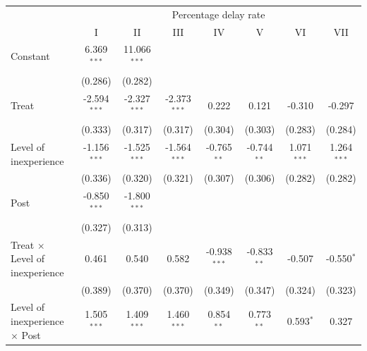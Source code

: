 \documentclass[
]{article}
\begin{document}
\begin{tabular}{lccccccc}
   \toprule
    & \multicolumn{7}{c}{Percentage delay rate}\\
                                                        & I              & II             & III            & IV             & V             & VI             & VII\\  
   Constant                                             & 6.369$^{***}$  & 11.066$^{***}$ &                &                &               &                &   \\   
                                                        & (0.286)        & (0.282)        &                &                &               &                &   \\   
   Treat                                                & -2.594$^{***}$ & -2.327$^{***}$ & -2.373$^{***}$ & 0.222          & 0.121         & -0.310         & -0.297\\   
                                                        & (0.333)        & (0.317)        & (0.317)        & (0.304)        & (0.303)       & (0.283)        & (0.284)\\   
   Level of inexperience                                & -1.156$^{***}$ & -1.525$^{***}$ & -1.564$^{***}$ & -0.765$^{**}$  & -0.744$^{**}$ & 1.071$^{***}$  & 1.264$^{***}$\\   
                                                        & (0.336)        & (0.320)        & (0.321)        & (0.307)        & (0.306)       & (0.282)        & (0.282)\\   
   Post                                                 & -0.850$^{***}$ & -1.800$^{***}$ &                &                &               &                &   \\   
                                                        & (0.327)        & (0.313)        &                &                &               &                &   \\   
   Treat $\times$ Level of inexperience                 & 0.461          & 0.540          & 0.582          & -0.938$^{***}$ & -0.833$^{**}$ & -0.507         & -0.550$^{*}$\\   
                                                        & (0.389)        & (0.370)        & (0.370)        & (0.349)        & (0.347)       & (0.324)        & (0.323)\\   
   Level of inexperience $\times$ Post                  & 1.505$^{***}$  & 1.409$^{***}$  & 1.460$^{***}$  & 0.854$^{**}$   & 0.773$^{**}$  & 0.593$^{*}$    & 0.327\\   

\end{tabular}
\end{document}
